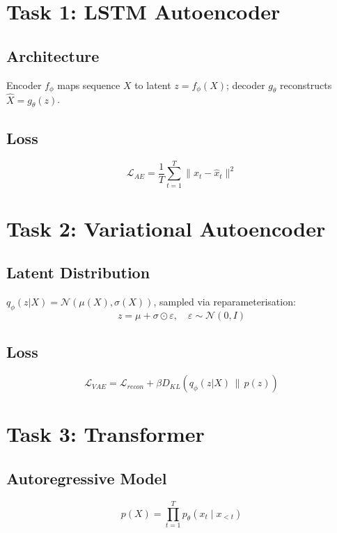 \documentclass{article}
\begin{document}
\section{Task 1: LSTM Autoencoder}
\subsection{Architecture}
Encoder $f_\phi$ maps sequence $X$ to latent $z = f_\phi(X)$; decoder $g_\theta$ reconstructs $\hat{X} = g_\theta(z)$.

\subsection{Loss}
\begin{equation}
\mathcal{L}_{AE} = \frac{1}{T}\sum_{t=1}^{T}\|x_t - \hat{x}_t\|^2
\end{equation}

\section{Task 2: Variational Autoencoder}
\subsection{Latent Distribution}
$q_\phi(z|X) = \mathcal{N}(\mu(X), \sigma(X))$, sampled via reparameterisation:
\begin{equation}
z = \mu + \sigma \odot \varepsilon, \quad \varepsilon \sim \mathcal{N}(0, I)
\end{equation}

\subsection{Loss}
\begin{equation}
\mathcal{L}_{VAE} = \mathcal{L}_{recon} + \beta D_{KL}\!\left(q_\phi(z|X)\,\|\,p(z)\right)
\end{equation}

\section{Task 3: Transformer}
\subsection{Autoregressive Model}
\begin{equation}
p(X) = \prod_{t=1}^{T} p_\theta(x_t \mid x_{<t})
\end{equation}
\end{document}
